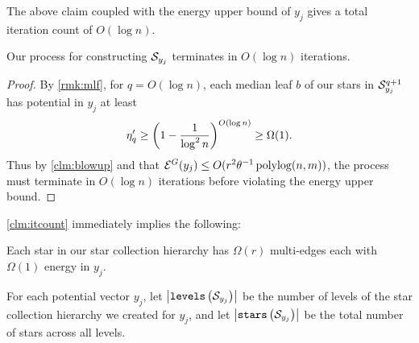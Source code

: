 \documentclass{article}
\begin{document}
The above claim coupled with the energy upper bound of $y_j$ gives a total iteration
count of $O(\log n)$.
\begin{claim}\label{clm:itcount}
    Our process for constructing $\mathcal{S}_{y_j}$ terminates
    in $O(\log n)$ iterations.
\end{claim}
\begin{proof}
By \cref{rmk:mlf},
for $q=O(\log n)$,
each median leaf $b$ of our stars in $\mathcal{S}_{y_j}^{q+1}$ has potential in $y_j$ at least
\begin{align*}
\eta_{q}' \geq \left(1 - \frac{1}{\log^2n}\right)^{O(\log n)} \geq \Omega(1).
\end{align*}
Thus by \cref{clm:blowup} and 
that $\mathcal{E}^G(y_j) \leq O(r^2\theta^{-1}\operatorname{polylog}(n,m))$,
the process must terminate in $O(\log n)$ iterations before violating
the energy upper bound.
\end{proof}

\cref{clm:itcount} immediately implies the following:

\begin{claim}
    Each star in our star collection hierarchy has
    $\Omega(r)$ multi-edges each with $\Omega(1)$ energy in $y_j$.
\end{claim}

For each potential vector $y_j$, let $\left|\mathtt{levels}\left(\mathcal{S}_{y_j}\right) \right|$ be the number of levels
of the star collection hierarchy we created for $y_j$,
and let $\left|\mathtt{stars}\left(\mathcal{S}_{y_j}\right) \right|$ be the total number of stars
across all levels.
\end{document}
